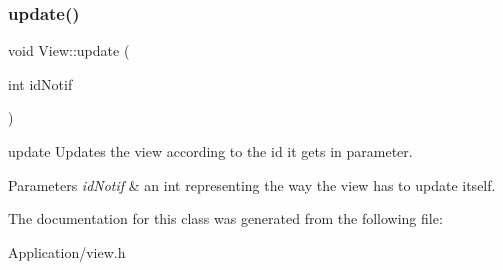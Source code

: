 \subsubsection{\texorpdfstring{update()}{update()}}
{\footnotesize\ttfamily void View\+::update (\begin{DoxyParamCaption}\item[{int}]{id\+Notif }\end{DoxyParamCaption})}



update Updates the view according to the id it gets in parameter. 


\begin{DoxyParams}{Parameters}
{\em id\+Notif} & an int representing the way the view has to update itself. \\
\hline
\end{DoxyParams}


The documentation for this class was generated from the following file\+:\begin{DoxyCompactItemize}
\item 
Application/view.\+h\end{DoxyCompactItemize}
